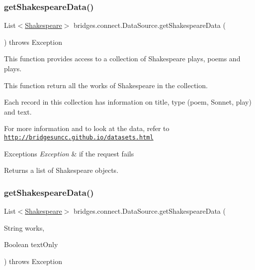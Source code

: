 \subsubsection{\texorpdfstring{get\+Shakespeare\+Data()}{getShakespeareData()}\hspace{0.1cm}{\footnotesize\ttfamily [1/3]}}
{\footnotesize\ttfamily List$<$\hyperlink{classbridges_1_1data__src__dependent_1_1_shakespeare}{Shakespeare}$>$ bridges.\+connect.\+Data\+Source.\+get\+Shakespeare\+Data (\begin{DoxyParamCaption}{ }\end{DoxyParamCaption}) throws Exception}



This function provides access to a collection of Shakespeare plays, poems and plays. 

This function return all the works of Shakespeare in the collection.

Each record in this collection has information on title, type (poem, Sonnet, play) and text.

For more information and to look at the data, refer to \href{http://bridgesuncc.github.io/datasets.html}{\tt http\+://bridgesuncc.\+github.\+io/datasets.\+html}


\begin{DoxyExceptions}{Exceptions}
{\em Exception} & if the request fails\\
\hline
\end{DoxyExceptions}
\begin{DoxyReturn}{Returns}
a list of Shakespeare objects. 
\end{DoxyReturn}
\mbox{\label{classbridges_1_1connect_1_1_data_source_abf8e8f8ff3eb14fa6c6b5ce6b48dbadb}} 
\subsubsection{\texorpdfstring{get\+Shakespeare\+Data()}{getShakespeareData()}\hspace{0.1cm}{\footnotesize\ttfamily [2/3]}}
{\footnotesize\ttfamily List$<$\hyperlink{classbridges_1_1data__src__dependent_1_1_shakespeare}{Shakespeare}$>$ bridges.\+connect.\+Data\+Source.\+get\+Shakespeare\+Data (\begin{DoxyParamCaption}\item[{String}]{works,  }\item[{Boolean}]{text\+Only }\end{DoxyParamCaption}) throws Exception}



